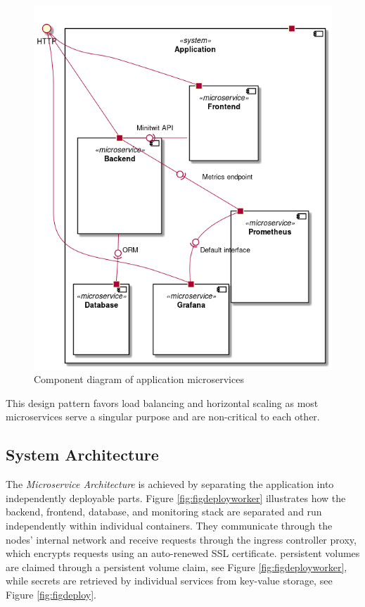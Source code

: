 \begin{figure}[H]
    \centering
    \includegraphics[scale=.43]{images/microservices-components.png}
    \caption{Component diagram of application microservices}
    \label{fig:microservices}
\end{figure}

This design pattern favors load balancing and horizontal scaling as most microservices serve a singular purpose and are non-critical to each other.

\subsection{System Architecture}
\label{subsec:system_architecture}
The \textit{Microservice Architecture} is achieved by separating the application into independently deployable parts. Figure \ref{fig:figdeployworker} illustrates how the backend, frontend, database, and monitoring stack are separated and run independently within individual containers. 
They communicate through the nodes' internal network and receive requests through the ingress controller proxy, which encrypts requests using an auto-renewed SSL certificate. 
persistent volumes are claimed through a persistent volume claim, see Figure \ref{fig:figdeployworker}, while secrets are retrieved by individual services from key-value storage, see  Figure \ref{fig:figdeploy}.

